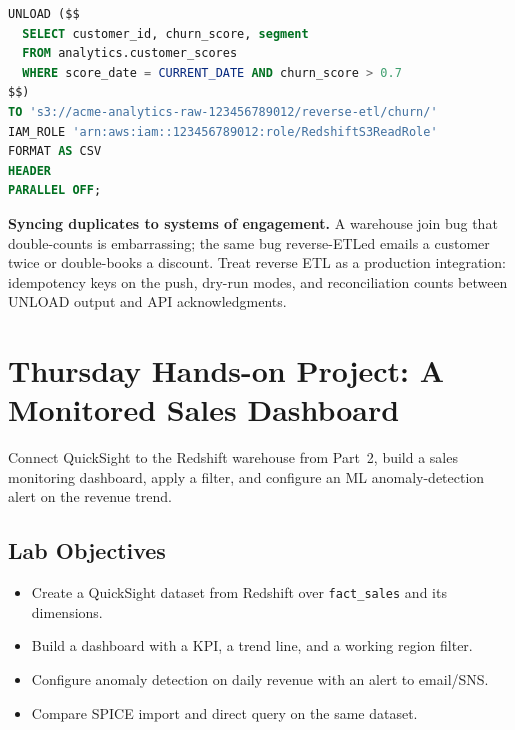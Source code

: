 \begin{lstlisting}[language=SQL,caption={UNLOAD a churn-risk segment for reverse ETL.},label={lst:ch16-unload}]
UNLOAD ($$
  SELECT customer_id, churn_score, segment
  FROM analytics.customer_scores
  WHERE score_date = CURRENT_DATE AND churn_score > 0.7
$$)
TO 's3://acme-analytics-raw-123456789012/reverse-etl/churn/'
IAM_ROLE 'arn:aws:iam::123456789012:role/RedshiftS3ReadRole'
FORMAT AS CSV
HEADER
PARALLEL OFF;
\end{lstlisting}

\begin{pitfall}
\textbf{Syncing duplicates to systems of engagement.} A warehouse join bug that double-counts is embarrassing; the same bug reverse-ETLed emails a customer twice or double-books a discount. Treat reverse ETL as a production integration: idempotency keys on the push, dry-run modes, and reconciliation counts between UNLOAD output and API acknowledgments.
\end{pitfall}

\section{Thursday Hands-on Project: A Monitored Sales Dashboard}
Connect QuickSight to the Redshift warehouse from Part~2, build a sales monitoring dashboard, apply a filter, and configure an ML anomaly-detection alert on the revenue trend.

\subsection*{Lab Objectives}
\begin{itemize}
    \item Create a QuickSight dataset from Redshift over \texttt{fact\_sales} and its dimensions.
    \item Build a dashboard with a KPI, a trend line, and a working region filter.
    \item Configure anomaly detection on daily revenue with an alert to email/SNS.
    \item Compare SPICE import and direct query on the same dataset.
\end{itemize}

